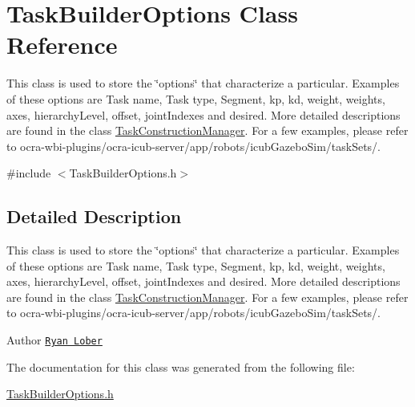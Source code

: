 \hypertarget{classTaskBuilderOptions}{}\section{Task\+Builder\+Options Class Reference}
\label{classTaskBuilderOptions}


This class is used to store the \char`\"{}options\char`\"{} that characterize a particular. Examples of these options are Task name, Task type, Segment, kp, kd, weight, weights, axes, hierarchy\+Level, offset, joint\+Indexes and desired. More detailed descriptions are found in the class \hyperlink{classTaskConstructionManager}{Task\+Construction\+Manager}. For a few examples, please refer to ocra-\/wbi-\/plugins/ocra-\/icub-\/server/app/robots/icub\+Gazebo\+Sim/task\+Sets/.  




{\ttfamily \#include $<$Task\+Builder\+Options.\+h$>$}



\subsection{Detailed Description}
This class is used to store the \char`\"{}options\char`\"{} that characterize a particular. Examples of these options are Task name, Task type, Segment, kp, kd, weight, weights, axes, hierarchy\+Level, offset, joint\+Indexes and desired. More detailed descriptions are found in the class \hyperlink{classTaskConstructionManager}{Task\+Construction\+Manager}. For a few examples, please refer to ocra-\/wbi-\/plugins/ocra-\/icub-\/server/app/robots/icub\+Gazebo\+Sim/task\+Sets/. 

\begin{DoxyAuthor}{Author}
\href{https://github.com/rlober}{\tt Ryan Lober} 
\end{DoxyAuthor}


The documentation for this class was generated from the following file\+:\begin{DoxyCompactItemize}
\item 
\hyperlink{TaskBuilderOptions_8h}{Task\+Builder\+Options.\+h}\end{DoxyCompactItemize}
